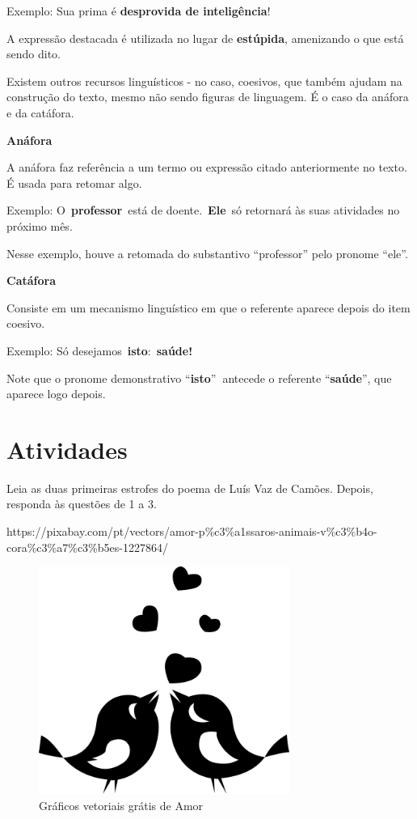 \begin{itemize}
\begin{itemize}
{Exemplo: Sua prima é \textbf{desprovida de inteligência}!

A expressão destacada é utilizada no lugar de \textbf{estúpida},
amenizando o que está sendo dito.

Existem outros recursos linguísticos - no caso, coesivos, que também
ajudam na construção do texto, mesmo não sendo figuras de linguagem. É o
caso da anáfora e da catáfora.

\textbf{Anáfora}

A anáfora faz referência a um termo ou expressão citado anteriormente no
texto. É usada para retomar algo.

Exemplo: O~\textbf{professor}~está de doente.~\textbf{Ele}~só retornará
às suas atividades no próximo mês.

Nesse exemplo, houve a retomada do substantivo ``professor'' pelo
pronome ``ele''.

\textbf{Catáfora}

Consiste em um mecanismo linguístico em que o referente aparece depois
do item coesivo.

Exemplo: Só desejamos~\textbf{isto}:~\textbf{saúde!}

Note que o pronome demonstrativo ``\textbf{isto}''\textbf{~}antecede o
referente ``\textbf{saúde}'', que aparece logo depois.
}

\section{Atividades}

Leia as duas primeiras estrofes do poema de Luís Vaz de Camões. Depois,
responda às questões de 1 a 3.

https://pixabay.com/pt/vectors/amor-p\%c3\%a1ssaros-animais-v\%c3\%b4o-cora\%c3\%a7\%c3\%b5es-1227864/

\begin{figure}
\centering
\includegraphics[width=3.22917in,height=2.92805in]{./_SAEB_9_POR/media/image24.png}
\caption{Gráficos vetoriais grátis de Amor}
\end{figure}


\end{itemize}
\end{itemize}
